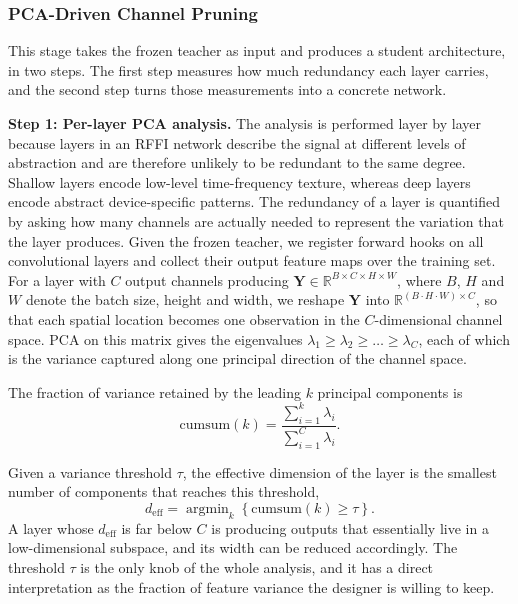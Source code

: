 \documentclass[journal,comsoc]{IEEEtran}
\DeclareMathOperator*{\argmin}{argmin}
\begin{document}
\subsubsection{PCA-Driven Channel Pruning}

This stage takes the frozen teacher as input and produces a student architecture, in two steps.
The first step measures how much redundancy each layer carries, and the second step turns those measurements into a concrete network.

\textbf{Step 1: Per-layer PCA analysis.}
The analysis is performed layer by layer because layers in an RFFI network describe the signal at different levels of abstraction and are therefore unlikely to be redundant to the same degree.
Shallow layers encode low-level time-frequency texture, whereas deep layers encode abstract device-specific patterns.
The redundancy of a layer is quantified by asking how many channels are actually needed to represent the variation that the layer produces.
Given the frozen teacher, we register forward hooks on all convolutional layers and collect their output feature maps over the training set.
For a layer with $C$ output channels producing $\mathbf{Y} \in \mathbb{R}^{B \times C \times H \times W}$, where $B$, $H$ and $W$ denote the batch size, height and width, we reshape $\mathbf{Y}$ into $\mathbb{R}^{(B\cdot H\cdot W) \times C}$, so that each spatial location becomes one observation in the $C$-dimensional channel space.
PCA on this matrix gives the eigenvalues $\lambda_1 \ge \lambda_2 \ge \dots \ge \lambda_C$, each of which is the variance captured along one principal direction of the channel space.

The fraction of variance retained by the leading $k$ principal components is
\begin{equation}
\label{eq:cumsum}
\text{cumsum}(k) = \frac{\sum_{i=1}^{k} \lambda_i}{\sum_{i=1}^{C} \lambda_i}.
\end{equation}

Given a variance threshold $\tau$, the effective dimension of the layer is the smallest number of components that reaches this threshold,
\begin{equation}
\label{eq:eff_dim}
d_{\text{eff}} = \argmin_k \left\{ \text{cumsum}(k) \geq \tau \right\}.
\end{equation}
A layer whose $d_{\text{eff}}$ is far below $C$ is producing outputs that essentially live in a low-dimensional subspace, and its width can be reduced accordingly.
The threshold $\tau$ is the only knob of the whole analysis, and it has a direct interpretation as the fraction of feature variance the designer is willing to keep.
\end{document}
